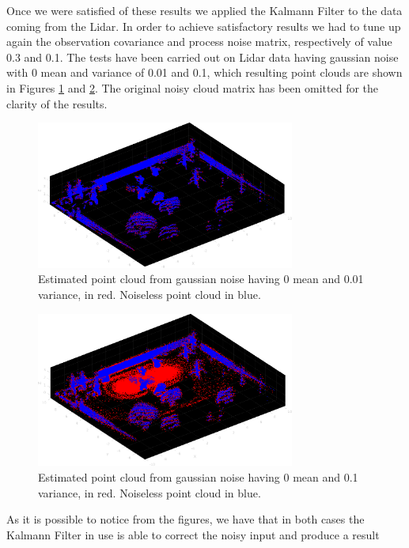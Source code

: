 \documentclass[twocolumn, a4paper]{article}
\begin{document}
\vspace{0.5cm}
Once we were satisfied of these results we applied the Kalmann Filter to the
data coming from the Lidar. In order to achieve satisfactory results we had
to tune up again the observation covariance and process noise matrix, 
respectively of value 0.3 and 0.1. The tests have been carried out on
Lidar data having gaussian noise with 0 mean and variance of 0.01 and 0.1, which
resulting point clouds are shown in Figures \ref{fig:KF_cloud_01} and
\ref{fig:KF_cloud_1}. The original noisy cloud matrix has been omitted for the
clarity of the results.
\begin{figure}[h!]
    \centering
    \includegraphics[width=8.5cm]{"../Report_images/Cloud_01_estimation_KF.png"}
    \caption{Estimated point cloud from gaussian noise having 0 mean and 0.01
             variance, in red. Noiseless point cloud in blue.}
    \label{fig:KF_cloud_01}
\end{figure}
\vspace{0.5cm}
\begin{figure}[h!]
    \centering
    \includegraphics[width=8.5cm]{"../Report_images/Cloud_1_estimation_KF.png"}
    \caption{Estimated point cloud from gaussian noise having 0 mean and 0.1
             variance, in red. Noiseless point cloud in blue.}
    \label{fig:KF_cloud_1}
\end{figure}
\newpage
As it is possible to notice from the figures, we have that in both cases the
Kalmann Filter in use is able to correct the noisy input and produce a result
\end{document}
